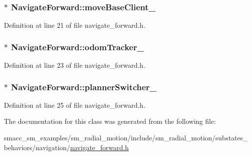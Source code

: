 \subsubsection[{\texorpdfstring{move\+Base\+Client\+\_\+}{moveBaseClient_}}]{$\ast$ Navigate\+Forward\+::move\+Base\+Client\+\_\+}\hypertarget{classNavigateForward_adeec3efc00297e64467a83d5ef82c44c}{}\label{classNavigateForward_adeec3efc00297e64467a83d5ef82c44c}


Definition at line 21 of file navigate\+\_\+forward.\+h.

\subsubsection[{\texorpdfstring{odom\+Tracker\+\_\+}{odomTracker_}}]{$\ast$ Navigate\+Forward\+::odom\+Tracker\+\_\+}\hypertarget{classNavigateForward_a1805443ef8d8fe292af6bde6298e43c9}{}\label{classNavigateForward_a1805443ef8d8fe292af6bde6298e43c9}


Definition at line 23 of file navigate\+\_\+forward.\+h.

\subsubsection[{\texorpdfstring{planner\+Switcher\+\_\+}{plannerSwitcher_}}]{$\ast$ Navigate\+Forward\+::planner\+Switcher\+\_\+}\hypertarget{classNavigateForward_a61052be8826f5bce96f56bfd0a0a8339}{}\label{classNavigateForward_a61052be8826f5bce96f56bfd0a0a8339}


Definition at line 25 of file navigate\+\_\+forward.\+h.



The documentation for this class was generated from the following file\+:\begin{DoxyCompactItemize}
\item 
smacc\+\_\+sm\+\_\+examples/sm\+\_\+radial\+\_\+motion/include/sm\+\_\+radial\+\_\+motion/substates\+\_\+behaviors/navigation/\hyperlink{navigate__forward_8h}{navigate\+\_\+forward.\+h}\end{DoxyCompactItemize}
